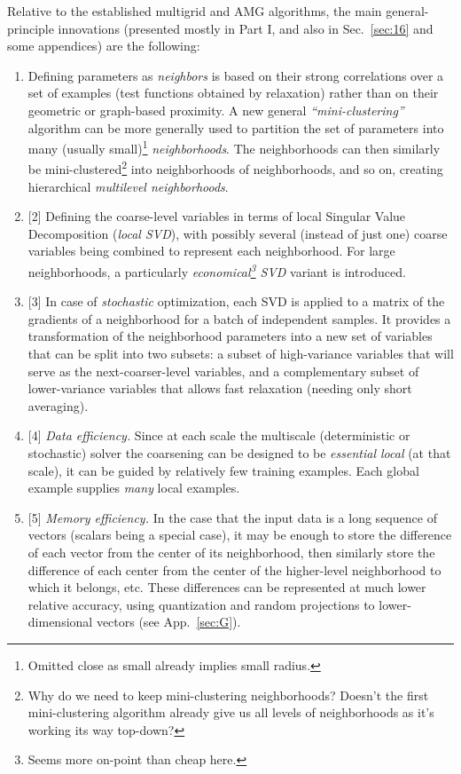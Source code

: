 \documentclass{article} %
\begin{document}
Relative to the established multigrid and AMG algorithms, the main general-principle innovations (presented mostly in Part I, and also in Sec.~\ref{sec:16} and some appendices) are the following:
\begin{enumerate}
    \item[(1)] Defining parameters as {\it neighbors} is based on their strong correlations over a set of examples (test functions obtained by relaxation) rather than on their geometric or graph-based proximity. A new general {\it ``mini-clustering''} algorithm can be more generally used to partition the set of parameters into many (usually small)\footnote{Omitted close as small already implies small radius.} {\it neighborhoods}. The neighborhoods can then similarly be mini-clustered\footnote{Why do we need to keep mini-clustering neighborhoods? Doesn't the first mini-clustering algorithm already give us all levels of neighborhoods as it's working its way top-down?} into neighborhoods of neighborhoods, and so on, creating hierarchical {\it multilevel neighborhoods}.
    \item{[2]} Defining the coarse-level variables in terms of local Singular Value Decomposition ({\it local SVD}), with possibly several (instead of just one) coarse variables being combined to represent each neighborhood. For large neighborhoods, a particularly {\it economical\footnote{Seems more on-point than cheap here.} SVD} variant is introduced.
    \item{[3]} In case of {\it stochastic} optimization, each SVD is applied to a matrix of the gradients of a neighborhood for a batch of independent samples. It provides a transformation of the neighborhood parameters into a new set of variables that can be split into two subsets: a subset of high-variance variables that will serve as the next-coarser-level variables, and a complementary subset of lower-variance variables that allows fast relaxation (needing only short averaging).
    \item{[4]} {\it Data efficiency.} Since at each scale the multiscale (deterministic or stochastic) solver the coarsening can be designed to be {\it essential local} (at that scale), it can be guided by relatively few training examples. Each global example supplies {\it many} local examples.
    \item{[5]} {\it Memory efficiency.} In the case that the input data is a long sequence of vectors (scalars being a special case), it may be enough to store the difference of each vector from the center of its neighborhood, then similarly store the difference of each center from the center of the higher-level neighborhood to which it belongs, etc. These differences can be represented at much lower relative accuracy, using quantization and random projections to lower-dimensional vectors (see App.~\ref{sec:G}).

\end{enumerate}
\end{document}
